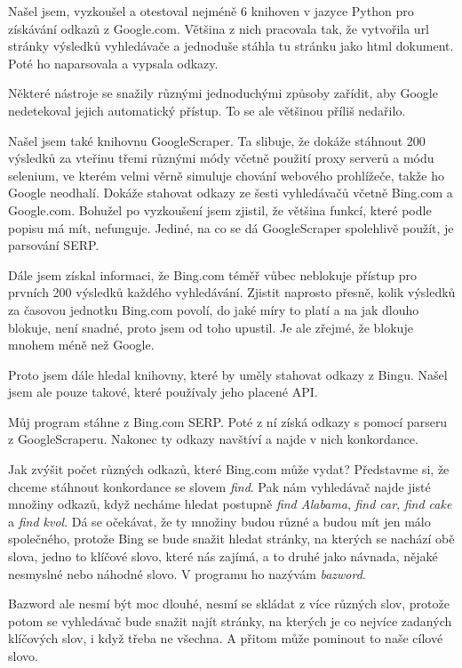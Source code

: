 
Našel jsem, vyzkoušel a otestoval nejméně 6 knihoven v jazyce Python pro
získávání odkazů z Google.com. Většina z nich pracovala tak, že vytvořila
url stránky výsledků vyhledávače a jednoduše stáhla tu stránku jako html
dokument. Poté ho naparsovala a vypsala odkazy.

Některé nástroje se snažily různými jednoduchými způsoby zařídit, aby Google
nedetekoval jejich automatický přístup. To se ale většinou příliš nedařilo.

Našel jsem také knihovnu GoogleScraper. Ta slibuje, že dokáže stáhnout 200
výsledků za vteřinu třemi různými módy včetně použití proxy serverů a módu
selenium, ve kterém velmi věrně simuluje chování webového prohlížeče, takže
ho Google neodhalí. Dokáže stahovat odkazy ze šesti vyhledávačů včetně
Bing.com a Google.com. Bohužel po vyzkoušení jsem zjistil, že většina
funkcí, které podle popisu má mít, nefunguje. Jediné, na co se dá
GoogleScraper spolehlivě použít, je parsování SERP.

Dále jsem získal informaci, že Bing.com téměř vůbec neblokuje přístup pro prvních 200
výsledků každého vyhledávání. Zjistit naprosto přesně, kolik výsledků za
časovou jednotku Bing.com povolí, do jaké míry to platí a na jak dlouho
blokuje, není snadné, proto jsem od toho upustil. Je ale zřejmé, že blokuje
mnohem méně než Google.

Proto jsem dále hledal knihovny, které by uměly stahovat odkazy z Bingu.
Našel jsem ale pouze takové, které používaly jeho placené API.


Můj program stáhne z Bing.com SERP. Poté z ní získá odkazy s pomocí parseru
z GoogleScraperu. Nakonec ty odkazy navštíví a najde v nich konkordance.

Jak zvýšit počet různých odkazů, které Bing.com může vydat? Představme si,
že chceme stáhnout konkordance se slovem {\it find}. Pak nám vyhledávač
najde jisté množiny odkazů, když necháme hledat postupně {\it find Alabama}, {\it
find car}, {\it find cake} a {\it find kvol}. Dá se očekávat, že ty množiny
budou různé a budou mít jen málo společného, protože Bing se bude snažit hledat stránky,
na kterých se nachází obě slova, jedno to klíčové slovo, které nás zajímá,
a to druhé jako návnada, nějaké nesmyslné nebo náhodné slovo. V programu ho
nazývám {\it bazword}.

Bazword ale nesmí být moc dlouhé, nesmí se skládat z více různých slov,
protože potom se vyhledávač bude snažit najít stránky, na kterých je co
nejvíce zadaných klíčových slov, i když třeba ne všechna. A přitom může
pominout to naše cílové slovo.

